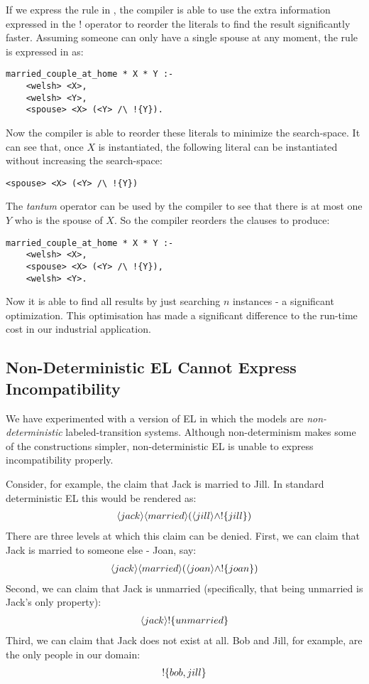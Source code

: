 If we express the rule in \ELFULL{}, the compiler is able to use the extra information expressed in the $!$ operator to reorder the literals to find the result significantly faster.
Assuming someone can only have a single spouse at any moment, the rule is expressed in \ELFULL{} as:
\begin{verbatim}
married_couple_at_home * X * Y :-
    <welsh> <X>,
    <welsh> <Y>,
    <spouse> <X> (<Y> /\ !{Y}).
\end{verbatim}	
Now the compiler is able to reorder these literals to minimize the search-space. 
It can see that, once $X$ is instantiated, the following literal can be instantiated without increasing the search-space:
\begin{verbatim}
<spouse> <X> (<Y> /\ !{Y})
\end{verbatim}
The \emph{tantum} operator can be used by the compiler to see that there is at most one $Y$ who is the spouse of $X$.
So the compiler reorders the clauses to produce:
\begin{verbatim}
married_couple_at_home * X * Y :-
    <welsh> <X>,
    <spouse> <X> (<Y> /\ !{Y}),
    <welsh> <Y>.
\end{verbatim}	
Now it is able to find all results by just searching $n$ instances - a significant optimization.
This optimisation has made a significant difference to the run-time cost in our industrial application.


\subsection{Non-Deterministic EL Cannot Express Incompatibility}

We have experimented with a version of EL in which the models are \emph{non-deterministic} labeled-transition systems.
Although non-determinism makes some of the constructions simpler, non-deterministic EL is unable to express incompatibility properly.

Consider, for example, the claim that Jack is married to Jill. 
In standard deterministic EL this would be rendered as:
\begin{eqnarray*}
\langle jack \rangle \langle married \rangle (\langle jill \rangle \land ! \{jill\})
\end{eqnarray*}
There are three levels at which this claim can be denied.
First, we can claim that Jack is married to someone else - Joan, say:
\begin{eqnarray*}
\langle jack \rangle \langle married \rangle (\langle joan \rangle \land ! \{joan\})
\end{eqnarray*}
Second, we can claim that Jack is unmarried (specifically, that being unmarried is Jack's only property):
\begin{eqnarray*}
\langle jack \rangle !\{unmarried\}
\end{eqnarray*}
Third, we can claim that Jack does not exist at all. Bob and Jill, for example, are the only people in our domain:
\begin{eqnarray*}
! \{bob, jill\}
\end{eqnarray*}

